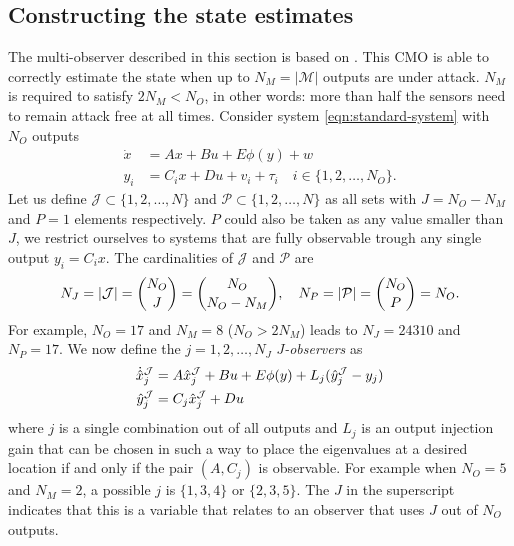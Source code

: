 \subsection{Constructing the state estimates}
\label{subsec:state-estimates}
The multi-observer described in this section is based on \cite[III B]{Chong2015ObservabilityAttacks}. This CMO is able to correctly estimate the state when up to $N_M = |\mathcal{M}|$ outputs are under attack. $N_M$ is required to satisfy $2N_M<N_O$, in other words: more than half the sensors need to remain attack free at all times. Consider system \eqref{eqn:standard-system} with $N_O$ outputs
\begin{equation*}
    \begin{split}
    \dot{x} &= Ax + Bu + E\phi(y) + w \\
        y_i &= C_ix + Du + v_i + \tau_i \quad i  \in \{1,2,\dots,N_O\}.
    \end{split}
\end{equation*}
Let us define $\mathcal{J} \subset \{1,2,\dots,N\}$ and $\mathcal{P} \subset \{1,2,\dots,N\}$ as all sets with  $J=N_O-N_M$ and  $P=1$ elements respectively. $P$ could also be taken as any value smaller than $J$, we restrict ourselves to systems that are fully observable trough any single output $y_i = C_ix$. The cardinalities of $\mathcal{J}$ and $\mathcal{P}$ are 
\begin{equation}\label{eqn:multi-observer-sizes}
    N_J = |\mathcal{J}|={N_O \choose J}={N_O \choose N_O-N_M}, \quad N_P = |\mathcal{P}| = {N_O \choose P} = N_O.
\end{equation}
For example, $N_O=17$ and $N_M=8$ ($N_O>2N_M$) leads to $N_J=24310$ and $N_P=17$.
We now define the $j=1,2,\dots,N_J$ $J$\textit{-observers} as
\begin{equation*}
    \begin{split}
        \dot{\hat{x}}_j^{\mathcal{J}} &= A\hat{x}_j^{\mathcal{J}} + Bu + E\phi(y) + L_j(\hat{y}_j^{\mathcal{J}} - y_j) \\
        \hat{y}_j^{\mathcal{J}} &= C_j\hat{x}_j^{\mathcal{J}} + Du
    \end{split}
\end{equation*}
where $j$ is a single combination out of all outputs and $L_j$ is an output injection gain that can be chosen in such a way to place the eigenvalues at a desired location if and only if the pair $(A,C_j)$ is observable. For example when $N_O=5$ and $N_M=2$, a possible $j$ is $\{1,3,4\}$ or $\{2,3,5\}$. The $J$ in the superscript indicates that this is a variable that relates to an observer that uses $J$ out of $N_O$ outputs.
